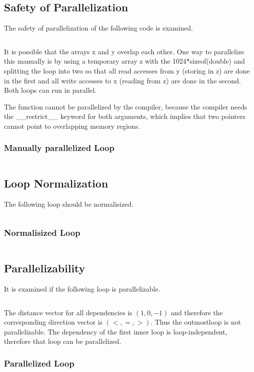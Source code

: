 \documentclass[parskip]{scrartcl}
\begin{document}
	\subsection{Safety of Parallelization}
	The safety of parallelization of the following code is examined.
	
	\inputminted	[linenos]{c}{ex2/01.c}
	
	It is possible that the arrays x and y overlap each other. One way to parallelize this manually is by using a temporary array z with the 1024*sizeof(double) and splitting the loop into two so that all read accesses from y (storing in z) are done in the first and all write accesses to x (reading from z) are done in the second. Both loops can run in parallel.
	
	The function cannot be parallelized by the compiler, because the compiler needs the \_\_restrict\_\_ keyword for both arguments, which implies that two pointers cannot point to overlapping memory regions.
	
	\subsubsection{Manually parallelized Loop}
	\inputminted	[linenos]{c}{ex2/01_par.c}
	
	\subsection{Loop Normalization}
	The following loop should be normalisized.
	
	\inputminted	[linenos]{c}{ex2/02.c}
	
	\subsubsection{Normalisized Loop}
	\inputminted	[linenos]{c}{ex2/02_normal.c}
	
	\subsection{Parallelizability}
	It is examined if the following loop is parallelizable.
	
	\inputminted	[linenos]{c}{ex2/03.c}
	
	The distance vector for all dependencies is $(1,0,-1)$ and therefore the corresponding direction vector is $(<,=,>)$. Thus the outmostloop is not parallelizable. The dependency of the first inner loop is loop-independent, therefore that loop can be parallelized.
	
	\subsubsection{Parallelized Loop}
	\inputminted[linenos]{c}{ex2/03_par.c}
\end{document}
